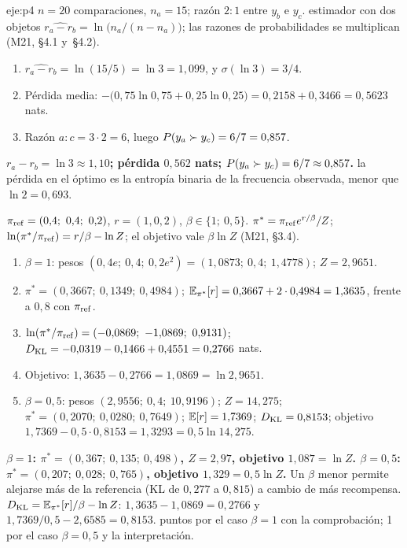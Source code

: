 \begin{solucion}{eje:p4}
\datos $n=20$ comparaciones, $n_a=15$; razón $2{:}1$ entre $y_b$ e $y_c$.
\planteamiento estimador con dos objetos $\widehat{r_a-r_b}=\ln\bigl(n_a/(n-n_a)\bigr)$; las razones de probabilidades se multiplican (M21, §4.1 y~§4.2).
\pasos
\begin{enumerate}[label=\arabic*.]
  \item $\widehat{r_a-r_b}=\ln(15/5)=\ln 3=1{,}099$, y $\sigma(\ln 3)=3/4$.
  \item Pérdida media: $-\bigl(0{,}75\ln 0{,}75+0{,}25\ln 0{,}25\bigr)=0{,}2158+0{,}3466=0{,}5623$ nats.
  \item Razón $a{:}c=3\cdot 2=6$, luego $P(y_a\succ y_c)=6/7=0{,}857$.
\end{enumerate}
\resultado \textbf{$r_a-r_b=\ln 3\approx 1{,}10$; pérdida $0{,}562$ nats; $P(y_a\succ y_c)=6/7\approx 0{,}857$.}
\comprobacion la pérdida en el óptimo es la entropía binaria de la frecuencia observada, menor que $\ln 2=0{,}693$.

\datos $\pi_{\mathrm{ref}}=(0{,}4;\ 0{,}4;\ 0{,}2)$, $r=(1,0,2)$, $\beta\in\{1;\ 0{,}5\}$.
\planteamiento $\pi^{*}=\pi_{\mathrm{ref}} e^{r/\beta}/Z$; $\ln(\pi^{*}/\pi_{\mathrm{ref}})=r/\beta-\ln Z$; el objetivo vale $\beta\ln Z$ (M21, §3.4).
\pasos
\begin{enumerate}[label=\arabic*.]
  \item $\beta=1$: pesos $(0{,}4e;\ 0{,}4;\ 0{,}2e^{2})=(1{,}0873;\ 0{,}4;\ 1{,}4778)$; $Z=2{,}9651$.
  \item $\pi^{*}=(0{,}3667;\ 0{,}1349;\ 0{,}4984)$; $\mathbb{E}_{\pi^{*}}[r]=0{,}3667+2\cdot 0{,}4984=1{,}3635$, frente a $0{,}8$ con $\pi_{\mathrm{ref}}$.
  \item $\ln(\pi^{*}/\piref)=(-0{,}0869;\ -1{,}0869;\ 0{,}9131)$; $D_{\mathrm{KL}}=-0{,}0319-0{,}1466+0{,}4551=0{,}2766$ nats.
  \item Objetivo: $1{,}3635-0{,}2766=1{,}0869=\ln 2{,}9651$.
  \item $\beta=0{,}5$: pesos $(2{,}9556;\ 0{,}4;\ 10{,}9196)$; $Z=14{,}275$; $\pi^{*}=(0{,}2070;\ 0{,}0280;\ 0{,}7649)$; $\mathbb{E}[r]=1{,}7369$; $D_{\mathrm{KL}}=0{,}8153$; objetivo $1{,}7369-0{,}5\cdot 0{,}8153=1{,}3293=0{,}5\ln 14{,}275$.
\end{enumerate}
\resultado \textbf{$\beta=1$: $\pi^{*}=(0{,}367;\ 0{,}135;\ 0{,}498)$, $Z=2{,}97$, objetivo $1{,}087=\ln Z$. $\beta=0{,}5$: $\pi^{*}=(0{,}207;\ 0{,}028;\ 0{,}765)$, objetivo $1{,}329=0{,}5\ln Z$.} Un $\beta$ menor permite alejarse más de la referencia (KL de $0{,}277$ a $0{,}815$) a cambio de más recompensa.
\comprobacion $D_{\mathrm{KL}}=\mathbb{E}_{\pi^{*}}[r]/\beta-\ln Z$: $1{,}3635-1{,}0869=0{,}2766$ y $1{,}7369/0{,}5-2{,}6585=0{,}8153$.
 puntos por el caso $\beta=1$ con la comprobación; 1 por el caso $\beta=0{,}5$ y la interpretación.


\end{solucion}
